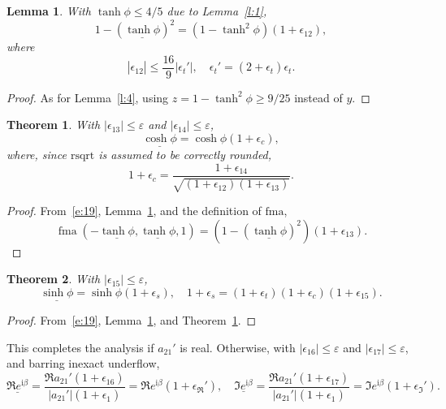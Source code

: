 \documentclass[a4paper,12pt,twoside]{article}
\newtheorem{thm}{Theorem}
\newtheorem{lem}{Lemma}
\begin{document}
\begin{lem}\label{l:8}
  With $\tanh\phi\le 4/5$ due to Lemma~\ref{l:1},
  \begin{displaymath}
    1-(\underline{\tanh\phi})^2=(1-\tanh^2\phi)(1+\epsilon_{12}),
  \end{displaymath}
  where
  \begin{displaymath}
    |\epsilon_{12}^{}|\le\frac{16}{9}|\epsilon_t'|,\quad
    \epsilon_t'=(2+\epsilon_t^{})\epsilon_t^{}.
  \end{displaymath}
\end{lem}
\begin{proof}
  As for Lemma~\ref{l:4}, using $z=1-\tanh^2\phi\ge 9/25$ instead of
  $y$.
\end{proof}

\begin{thm}\label{t:2}
  With $|\epsilon_{13}|\le\varepsilon$ and $|\epsilon_{14}|\le\varepsilon$,
  \begin{displaymath}
    \underline{\cosh\phi}=\cosh\phi(1+\epsilon_c),
  \end{displaymath}
  where, since $\mathrm{rsqrt}$ is assumed to be correctly rounded,
  \begin{equation}
    1+\epsilon_c=\frac{1+\epsilon_{14}}{\sqrt{(1+\epsilon_{12})(1+\epsilon_{13})}}.
    \label{e:24}
  \end{equation}
\end{thm}
\begin{proof}
  From~\eqref{e:19}, Lemma~\ref{l:8}, and the definition of $\mathrm{fma}$,
  \begin{displaymath}
    \mathop{\mathrm{fma}}(-\underline{\tanh\phi},\underline{\tanh\phi},1)=(1-(\underline{\tanh\phi})^2)(1+\epsilon_{13}).
  \end{displaymath}
\end{proof}

\begin{thm}\label{t:3}
  With $|\epsilon_{15}|\le\varepsilon$,
  \begin{equation}
    \underline{\sinh\phi}=\sinh\phi(1+\epsilon_s),\quad
    1+\epsilon_s=(1+\epsilon_t)(1+\epsilon_c)(1+\epsilon_{15}).
    \label{e:25}
  \end{equation}
\end{thm}
\begin{proof}
  From~\eqref{e:19}, Lemma~\ref{l:8}, and Theorem~\ref{t:2}.
\end{proof}

This completes the analysis if $a_{21}'$ is real.  Otherwise, with
$|\epsilon_{16}|\le\varepsilon$ and $|\epsilon_{17}|\le\varepsilon$,
and barring inexact underflow,
\begin{displaymath}
  \underline{\Re{e^{\mathrm{i}\beta}}}=\frac{\Re{a_{21}'}(1+\epsilon_{16}^{})}{|a_{21}'|(1+\epsilon_1^{})}=\Re{e^{\mathrm{i}\beta}}(1+\epsilon_{\Re}'),\quad
  \underline{\Im{e^{\mathrm{i}\beta}}}=\frac{\Re{a_{21}'}(1+\epsilon_{17}^{})}{|a_{21}'|(1+\epsilon_1^{})}=\Im{e^{\mathrm{i}\beta}}(1+\epsilon_{\Im}').
\end{displaymath}
\end{document}
